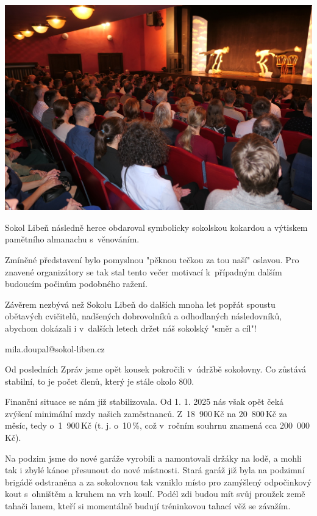 \documentclass[11pt]{article}
\begin{document}
\begin{center}
  \includegraphics[width=0.7\linewidth]{./FOTKY ZPRAVY/DIVADLO 3.JPG}
\end{center}

Sokol Libeň následně herce obdaroval symbolicky sokolskou kokardou a
výtiskem pamětního almanachu s~věnováním.

Zmíněné představení bylo pomyslnou "pěknou tečkou za tou naší" oslavou.
Pro znavené organizátory se tak stal tento večer motivací k~případným
dalším budoucím počinům podobného ražení.

Závěrem nezbývá než Sokolu Libeň do dalších mnoha let popřát spoustu
obětavých cvičitelů, nadšených dobrovolníků a odhodlaných následovníků,
abychom dokázali i v~dalších letech držet náš sokolský "směr a cíl"!

\vspace*{24pt}

\signature{Miloslav Doupal}{mila.doupal@sokol-liben.cz}

\clearpage


Od posledních Zpráv jsme opět kousek pokročili v~údržbě sokolovny. Co zůstává stabilní, to je počet členů, který je stále okolo 800.

Finanční situace se nám již stabilizovala. Od 1. 1. 2025 nás však opět čeká zvýšení minimální mzdy našich zaměstnanců. Z~18~900\,Kč na 20~800\,Kč za měsíc, tedy o~1~900\,Kč (t. j. o~10\,\%, což v~ročním souhrnu znamená cca 200~000\,Kč).

Na podzim jsme do nové garáže vyrobili a namontovali držáky na lodě, a mohli tak i zbylé kánoe přesunout do nové místnosti. Stará garáž již byla na podzimní brigádě odstraněna a za sokolovnou tak vzniklo místo pro zamýšlený odpočinkový kout s~ohništěm a kruhem na vrh koulí. Podél zdi budou mít svůj proužek země tahači lanem, kteří si momentálně budují tréninkovou tahací věž se závažím.
\end{document}
